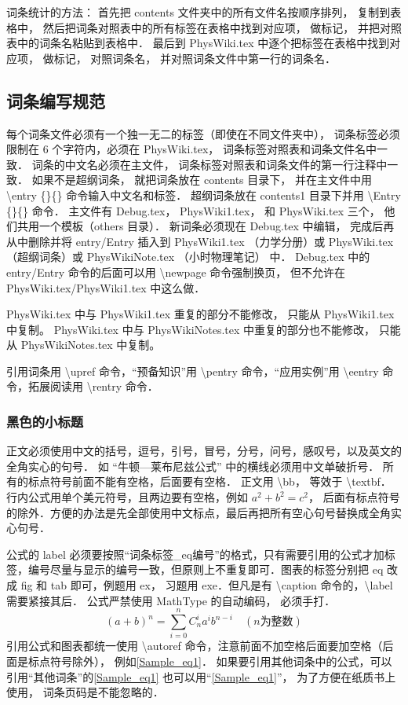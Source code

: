词条统计的方法： 首先把 contents 文件夹中的所有文件名按顺序排列， 复制到表格中， 然后把词条对照表中的所有标签在表格中找到对应项， 做标记， 并把对照表中的词条名粘贴到表格中． 最后到 PhysWiki.tex 中逐个把标签在表格中找到对应项， 做标记， 对照词条名， 并对照词条文件中第一行的词条名．

\subsection{词条编写规范}

每个词条文件必须有一个独一无二的标签（即使在不同文件夹中）， 词条标签必须限制在 6 个字符内，必须在 PhysWiki.tex， 词条标签对照表和词条文件名中一致． 词条的中文名必须在主文件， 词条标签对照表和词条文件的第一行注释中一致． 如果不是超纲词条， 就把词条放在 contents 目录下， 并在主文件中用 \textbackslash entry \{\}\{\} 命令输入中文名和标签． 超纲词条放在 contents1 目录下并用 \textbackslash Entry \{\}\{\} 命令． 主文件有 Debug.tex， PhysWiki1.tex， 和 PhysWiki.tex 三个， 他们共用一个模板（others 目录）． 新词条必须现在 Debug.tex 中编辑， 完成后再从中删除并将 entry/Entry 插入到 PhysWiki1.tex （力学分册）或 PhysWiki.tex（超纲词条）或 PhysWikiNote.tex （小时物理笔记） 中． Debug.tex 中的 entry/Entry 命令的后面可以用 \textbackslash newpage 命令强制换页， 但不允许在 PhysWiki.tex/PhysWiki1.tex 中这么做．

PhysWiki.tex 中与 PhysWiki1.tex 重复的部分不能修改， 只能从 PhysWiki1.tex 中复制。 PhysWiki.tex 中与 PhysWikiNotes.tex 中重复的部分也不能修改， 只能从 PhysWikiNotes.tex 中复制。

引用词条用 \textbackslash upref 命令，“预备知识”用 \textbackslash pentry 命令，“应用实例”用 \textbackslash eentry 命令，拓展阅读用 \textbackslash rentry 命令．

\subsubsection{黑色的小标题}

正文必须使用中文的括号，逗号，引号，冒号，分号，问号，感叹号，以及英文的全角实心的句号． 如 “牛顿—莱布尼兹公式” 中的横线必须用中文单破折号． 所有的标点符号前面不能有空格，后面要有空格． 正文用 \textbackslash bb， 等效于 \textbackslash textbf． 行内公式用单个美元符号，且两边要有空格，例如 $a^2+b^2=c^2$， 后面有标点符号的除外．方便的办法是先全部使用中文标点，最后再把所有空心句号替换成全角实心句号．

公式的 label 必须要按照“词条标签\_eq编号”的格式，只有需要引用的公式才加标签，编号尽量与显示的编号一致，但原则上不重复即可．图表的标签分别把 eq 改成 fig 和 tab 即可，例题用 ex， 习题用 exe．但凡是有 \textbackslash caption 命令的，\textbackslash label 需要紧接其后． 公式严禁使用 MathType 的自动编码， 必须手打．
\begin{equation}\label{Sample_eq1}
(a+b)^n = \sum_{i=0}^n C_n^i a^i b^{n-i} \quad (n\text{为整数})
\end{equation}
引用公式和图表都统一使用 \textbackslash autoref 命令，注意前面不加空格后面要加空格（后面是标点符号除外）， 例如\autoref{Sample_eq1}． 如果要引用其他词条中的公式，可以引用“其他词条”的\autoref{Sample_eq1} 也可以用“\autoref{Sample_eq1}”， 为了方便在纸质书上使用， 词条页码是不能忽略的．

